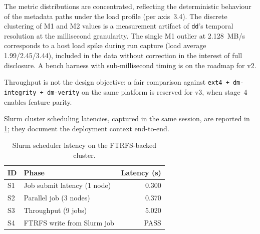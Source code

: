 The metric distributions are concentrated, reflecting the
deterministic behaviour of the metadata paths under the load
profile (per axis~3.4). The discrete clustering of M1 and M2
values is a measurement artifact of \texttt{dd}'s temporal
resolution at the millisecond granularity. The single M1 outlier
at 2.128~MB/s corresponds to a host load spike during run capture
(load average 1.99/2.45/3.44), included in the data without
correction in the interest of full disclosure. A bench harness
with sub-millisecond timing is on the roadmap for v2.

Throughput is not the design objective: a fair comparison against
\texttt{ext4 + dm-integrity + dm-verity} on the same platform is
reserved for v3, when stage~4 enables feature parity.

Slurm cluster scheduling latencies, captured in the same session,
are reported in \cref{tab:slurm}; they document the
deployment context end-to-end.

\begin{table}[ht]
\centering
\small
\caption{Slurm scheduler latency on the FTRFS-backed cluster.}
\label{tab:slurm}
\begin{tabular}{l l r}
\toprule
\textbf{ID} & \textbf{Phase} & \textbf{Latency (s)} \\
\midrule
S1 & Job submit latency (1 node)        & 0.300 \\
S2 & Parallel job (3 nodes)             & 0.370 \\
S3 & Throughput (9 jobs)                & 5.020 \\
S4 & FTRFS write from Slurm job         & PASS \\
\bottomrule
\end{tabular}
\end{table}

